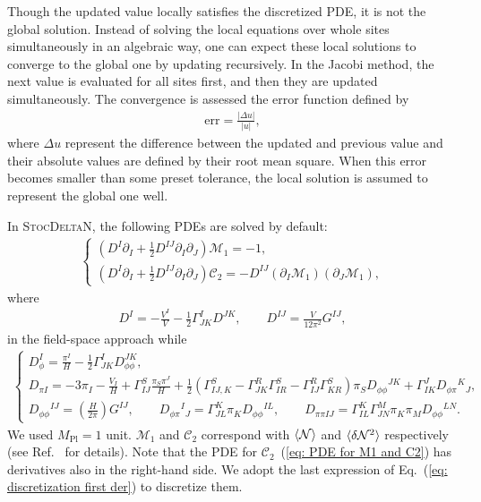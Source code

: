 \documentclass[aps, prd
, preprint
, nofootinbib 
, notitlepage
, superscriptaddress
, longbibliography
]{revtex4-1}
\newcommand{\Mpl}{M_\text{Pl}}
\newcommand{\dps}{\displaystyle}
\newcommand{\calC}{\mathcal{C}}
\newcommand{\calM}{\mathcal{M}}
\newcommand{\calN}{\mathcal{N}}
\newcommand{\bae}[1]{\begin{align} #1 \end{align}}
\newcommand{\bce}[1]{\begin{cases} #1 \end{cases}}
\begin{document}
Though the updated value locally satisfies the discretized PDE, it is not the global solution.
Instead of solving the local equations over whole sites simultaneously in an algebraic way,
one can expect these local solutions to converge to the global one by updating recursively.
In the Jacobi method, the next value is evaluated for all sites first, and then they are updated simultaneously.
The convergence is assessed the error function defined by
\bae{\label{eq: err}
    \mathrm{err}=\frac{|\Delta u|}{|u|},
}
where $\Delta u$ represent the difference between the updated and previous value and their absolute values are defined by their root mean square.
When this error becomes smaller than some preset tolerance, the local solution is assumed to represent the global one well.

In \textsc{StocDeltaN}, the following PDEs are solved by default:
\bae{\label{eq: PDE for M1 and C2}
    \bce{
        \dps
        \left(D^I\partial_I+\frac{1}{2}D^{IJ}\partial_I\partial_J\right)\calM_1=-1, \\[10pt]
        \dps
        \left(D^I\partial_I+\frac{1}{2}D^{IJ}\partial_I\partial_J\right)\calC_2=-D^{IJ}(\partial_I\calM_1)(\partial_J\calM_1),
    }
}
where
\bae{\label{eq: D in field space}
    D^I=-\frac{V^I}{V}-\frac{1}{2}\Gamma^I_{JK}D^{JK}, \qquad D^{IJ}=\frac{V}{12\pi^2}G^{IJ},
}
in the field-space approach while
\bae{\label{eq: D in phase space}
    \bce{
        \dps
        D_\phi^I=\frac{\pi^I}{H}-\frac{1}{2}\Gamma^I_{JK}D_{\phi\phi}^{JK}, \\[10pt] 
        \dps
        D_{\pi I}=-3\pi_I-\frac{V_I}{H}+\Gamma^S_{IJ}\frac{\pi_S\pi^J}{H}+\frac{1}{2}(\Gamma^S_{IJ,K}-\Gamma^R_{JK}\Gamma^S_{IR}-\Gamma^R_{IJ}\Gamma^S_{KR})\pi_SD_{\phi\phi}{}^{JK}+\Gamma^J_{IK}D_{\phi\pi}{}^K{}_J, \\[10pt]
        \dps
        D_{\phi\phi}{}^{IJ}=\left(\frac{H}{2\pi}\right)G^{IJ}, \qquad D_{\phi\pi}{}^I{}_J=\Gamma^K_{JL}\pi_KD_{\phi\phi}{}^{IL}, \qquad D_{\pi\pi IJ}=\Gamma^K_{IL}\Gamma^M_{JN}\pi_K\pi_MD_{\phi\phi}{}^{LN}.
    }
}
We used $\Mpl=1$ unit. $\calM_1$ and $\calC_2$ correspond with $\braket{\calN}$ and $\braket{\delta\calN^2}$ respectively (see Ref.~\cite{StocDeltaN} for details).
Note that the PDE for $\calC_2$~(\ref{eq: PDE for M1 and C2}) has derivatives also in the right-hand side. We adopt the last expression of Eq.~(\ref{eq: discretization first der}) to discretize them.
\end{document}
